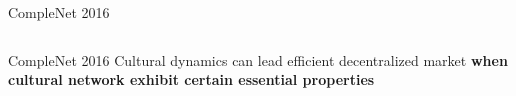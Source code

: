 \documentclass[9pt, handout=show,notes=show]{beamer}
\begin{document}
\begin{frame}{CompleNet 2016}
\begin{center}
\begin{columns}
\begin{column}{.5\textwidth}
	    \end{column}
	\end{columns}
    \end{center}
\end{frame}
\begin{frame}{CompleNet 2016}
    Cultural dynamics can lead efficient decentralized market \textbf{when cultural network exhibit certain essential properties}
    
\end{frame}
\end{document}
